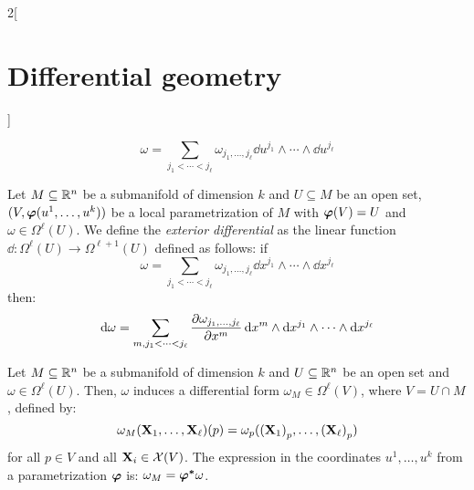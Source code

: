 \documentclass[../../../main_math.tex]{subfiles}
\begin{document}
\begin{multicols}{2}[\section{Differential geometry}]
\begin{definition}
    $$\omega=\sum_{j_1<\cdots<j_\ell}\omega_{j_1,\ldots,j_\ell}\dd{u^{j_1}}\wedge\cdots\wedge\dd{u^{j_\ell}}$$
  \end{definition}
  \begin{definition}
    Let $M\subseteq\mathbb{R}^n$ be a submanifold of dimension $k$ and $U\subseteq M$ be an open set, $(V,\boldsymbol{\mathrm{\varphi}}(u^1,\ldots,u^k))$ be a local parametrization of $M$ with $\boldsymbol{\mathrm{\varphi}}(V)=U$ and $\omega\in\Omega^\ell(U)$. We define the \emph{exterior differential} as the linear function $\dd:\Omega^\ell(U)\rightarrow\Omega^{\ell+1}(U)$ defined as follows: if $$\omega=\sum_{j_1<\cdots<j_\ell}\omega_{j_1,\ldots,j_\ell}\dd{x^{j_1}}\wedge\cdots\wedge\dd{x^{j_\ell}}$$
    then: $$\dd{\omega}=\sum_{m,j_1<\cdots<j_\ell}\pdv{\omega_{j_1,\ldots,j_\ell}}{x^m}\dd{x^m}\wedge\dd{x^{j_1}}\wedge\cdots\wedge\dd{x^{j_\ell}}$$
  \end{definition}
  \begin{proposition}
    Let $M\subseteq\mathbb{R}^n$ be a submanifold of dimension $k$ and $U\subseteq \mathbb{R}^n$ be an open set and $\omega\in\Omega^\ell(U)$. Then, $\omega$ induces a differential form $\omega_M\in\Omega^\ell(V)$, where $V=U\cap M$, defined by: $$\omega_M(\boldsymbol{\mathrm{X}}_1,\ldots,\boldsymbol{\mathrm{X}}_\ell)(p)=\omega_p({(\boldsymbol{\mathrm{X}}_1)}_p,\ldots,{(\boldsymbol{\mathrm{X}}_\ell)}_p)$$
    for all $p\in V$ and all $\boldsymbol{\mathrm{X}}_i\in\mathcal{X}(V)$.
    The expression in the coordinates $u^1,\ldots,u^k$ from a parametrization $\boldsymbol{\mathrm{\varphi}}$ is: $\omega_M=\boldsymbol{\mathrm{\varphi^*}}\omega$.
  \end{proposition}

\end{multicols}
\end{document}

